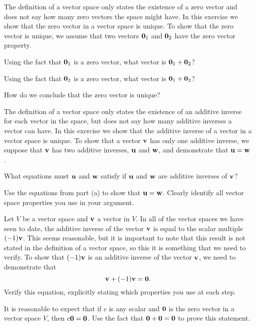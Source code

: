 \label{sec:vec_space_exer}
\be
\item The definition of a vector space only states the existence of a zero vector and does not say how many zero vectors the space might have. In this exercise we show that the zero vector in a vector space is unique. To show that the zero vector is unique, we assume that two vectors $\mathbf{0}_1$ and $\mathbf{0}_2$ have the zero vector property.  
	\ba
	\item Using the fact that $\mathbf{0}_1$ is a zero vector, what vector is $\mathbf{0}_1 + \mathbf{0}_2$?

	\item Using the fact that $\mathbf{0}_2$ is a zero vector, what vector is $\mathbf{0}_1 + \mathbf{0}_2$? 

	\item How do we conclude that the zero vector is unique? 
	
	\ea


\item The definition of a vector space only states the existence of an additive inverse for each vector in the space, but does not say how many additive inverses a vector can have. In this exercise we show that the additive inverse of a vector in a vector space is unique. To show that a vector $\mathbf{v}$ has only one additive inverse, we suppose that $\mathbf{v}$ has two additive inverses, $\mathbf{u}$ and $\mathbf{w}$, and demonstrate that $\mathbf{u} = \mathbf{w}$. 
	\ba
	\item What equations must $\mathbf{u}$ and $\mathbf{w}$ satisfy if $\mathbf{u}$ and $\mathbf{w}$ are additive inverses of $\mathbf{v}$?
		
	\item Use the equations from part (a) to show that $\mathbf{u} = \mathbf{w}$. Clearly identify all vector space properties you use in your argument.

	\ea



\item Let $V$ be a vector space and $\mathbf{v}$ a vector in $V$. In all of the vector spaces we have seen to date, the additive inverse of the vector $\mathbf{v}$ is equal to the scalar multiple $(-1)\mathbf{v}$. This seems reasonable, but it is important to note that this result is not stated in the definition of a vector space, so this it is something that we need to verify. To show that $(-1)\mathbf{v}$ is an additive inverse of the vector $\mathbf{v}$, we need to demonstrate that 
\[\mathbf{v} + (-1)\mathbf{v} = \mathbf{0}.\]
Verify this equation, explicitly stating which properties you use at each step.

\item \label{ex:5_a_scalar_times_0} It is reasonable to expect that if $c$ is any scalar and $\mathbf{0}$ is the zero vector in a vector space $V$, then $c \mathbf{0} = \mathbf{0}$. Use the fact that $\mathbf{0} + \mathbf{0} = \mathbf{0}$ to prove this statement.

